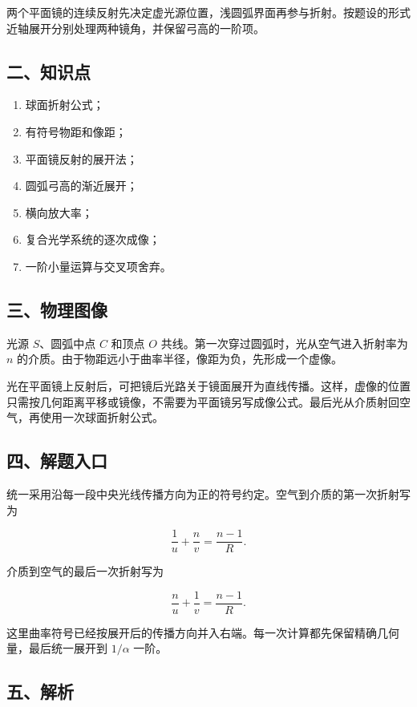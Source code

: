 \documentclass[12pt,a4paper,UTF8]{ctexart}
\newcommand{\tightlist}{\setlength{\itemsep}{0pt}\setlength{\parskip}{0pt}}
\begin{document}
两个平面镜的连续反射先决定虚光源位置，浅圆弧界面再参与折射。按题设的形式近轴展开分别处理两种镜角，并保留弓高的一阶项。

\subsection{二、知识点}\label{ux4e8cux77e5ux8bc6ux70b9-2}

\begin{enumerate}
\def\labelenumi{\arabic{enumi}.}
\tightlist
\item
  球面折射公式；
\item
  有符号物距和像距；
\item
  平面镜反射的展开法；
\item
  圆弧弓高的渐近展开；
\item
  横向放大率；
\item
  复合光学系统的逐次成像；
\item
  一阶小量运算与交叉项舍弃。
\end{enumerate}

\subsection{三、物理图像}\label{ux4e09ux7269ux7406ux56feux50cf-2}

光源 \(S\)、圆弧中点 \(C\) 和顶点 \(O\)
共线。第一次穿过圆弧时，光从空气进入折射率为 \(n\)
的介质。由于物距远小于曲率半径，像距为负，先形成一个虚像。

光在平面镜上反射后，可把镜后光路关于镜面展开为直线传播。这样，虚像的位置只需按几何距离平移或镜像，不需要为平面镜另写成像公式。最后光从介质射回空气，再使用一次球面折射公式。

\subsection{四、解题入口}\label{ux56dbux89e3ux9898ux5165ux53e3-2}

统一采用沿每一段中央光线传播方向为正的符号约定。空气到介质的第一次折射写为

\[
\frac1u+\frac n v=\frac{n-1}{R}.
\tag{1}
\]

介质到空气的最后一次折射写为

\[
\frac n u+\frac1v=\frac{n-1}{R}.
\tag{2}
\]

这里曲率符号已经按展开后的传播方向并入右端。每一次计算都先保留精确几何量，最后统一展开到
\(1/\alpha\) 一阶。

\subsection{五、解析}\label{ux4e94ux89e3ux6790-2}
\end{document}
